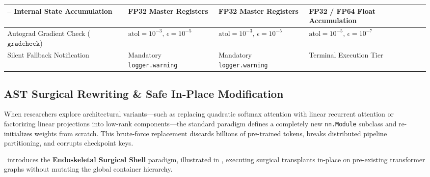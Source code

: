 \begin{table}[t]
\begin{tabularx}{\textwidth}{@{} p{4.2cm} X X X @{}}
-- Internal State Accumulation & FP32 Master Registers & FP32 Master Registers & FP32 / FP64 Float Accumulation \\
\midrule
Autograd Gradient Check ($\texttt{gradcheck}$) & $\text{atol} = 10^{-3}, \, \epsilon = 10^{-5}$ & $\text{atol} = 10^{-3}, \, \epsilon = 10^{-5}$ & $\text{atol} = 10^{-5}, \, \epsilon = 10^{-7}$ \\
Silent Fallback Notification & Mandatory \texttt{logger.warning} & Mandatory \texttt{logger.warning} & Terminal Execution Tier \\
\bottomrule
\end{tabularx}
\end{table}

\subsection{AST Surgical Rewriting \& Safe In-Place Modification}
\label{subsec:ast_rewriting}
\label{subsec:surgical_shells}

When researchers explore architectural variants---such as replacing quadratic softmax attention with linear recurrent attention or factorizing linear projections into low-rank components---the standard paradigm defines a completely new \texttt{nn.Module} subclass and re-initializes weights from scratch. This brute-force replacement discards billions of pre-trained tokens, breaks distributed pipeline partitioning, and corrupts checkpoint keys.

\neuralops\ introduces the \textbf{Endoskeletal Surgical Shell} paradigm, illustrated in , executing surgical transplants in-place on pre-existing transformer graphs without mutating the global container hierarchy.

